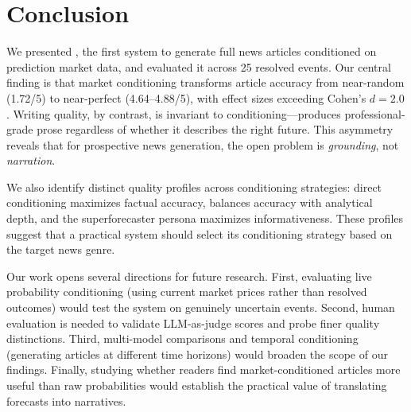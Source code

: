 \section{Conclusion}
\label{sec:conclusion}

We presented \systemname, the first system to generate full news articles conditioned on prediction market data, and evaluated it across 25 resolved \polymarket events. Our central finding is that market conditioning transforms article accuracy from near-random (1.72/5) to near-perfect (4.64--4.88/5), with effect sizes exceeding Cohen's $d = 2.0$. Writing quality, by contrast, is invariant to conditioning---\gptfour produces professional-grade prose regardless of whether it describes the right future. This asymmetry reveals that for prospective news generation, the open problem is \emph{grounding}, not \emph{narration}.

We also identify distinct quality profiles across conditioning strategies: direct conditioning maximizes factual accuracy, \mcp balances accuracy with analytical depth, and the superforecaster persona maximizes informativeness. These profiles suggest that a practical system should select its conditioning strategy based on the target news genre.

Our work opens several directions for future research. First, evaluating live probability conditioning (using current market prices rather than resolved outcomes) would test the system on genuinely uncertain events. Second, human evaluation is needed to validate LLM-as-judge scores and probe finer quality distinctions. Third, multi-model comparisons and temporal conditioning (generating articles at different time horizons) would broaden the scope of our findings. Finally, studying whether readers find market-conditioned articles more useful than raw probabilities would establish the practical value of translating forecasts into narratives.
